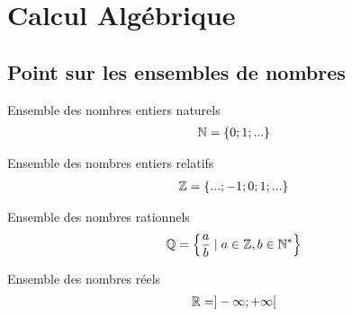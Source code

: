 \chapter{Calcul Algébrique}
\section{Point sur les ensembles de nombres}

\begin{definition}{Ensemble des nombres entiers naturels}
	\begin{align*}
		\mathbb{N} = \{0; 1; ...\}
	\end{align*}
\end{definition}

\begin{definition}{Ensemble des nombres entiers relatifs}
	\begin{align*}
		\mathbb{Z} = \{...; -1; 0; 1; ...\}
	\end{align*}
\end{definition}

\begin{definition}{Ensemble des nombres rationnels}
	\begin{align*}
		\mathbb{Q} = \left\{\frac{a}{b} \mid a \in \mathbb{Z}, b \in \mathbb{N}^* \right\}
	\end{align*}
\end{definition}

\begin{definition}{Ensemble des nombres réels}
	\begin{align*}
		\mathbb{R} = ]-\infty; +\infty[
	\end{align*}
\end{definition}

